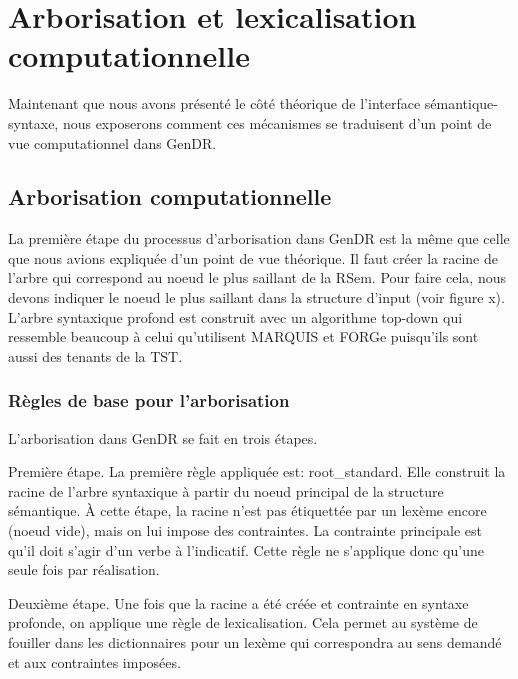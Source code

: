 
\section{Arborisation et lexicalisation computationnelle}\label{secarbolex}

Maintenant que nous avons présenté le côté théorique de l'interface sémantique-syntaxe, nous exposerons comment ces mécanismes se traduisent d'un point de vue computationnel dans GenDR.

\subsection{Arborisation computationnelle}
La première étape du processus d'arborisation dans GenDR est la même que celle que nous avions expliquée d'un point de vue théorique. Il faut créer la racine de l'arbre qui correspond au noeud le plus saillant de la RSem. Pour faire cela, nous devons indiquer le noeud le plus saillant dans la structure d'input (voir figure x). L'arbre syntaxique profond est construit avec un algorithme top-down qui ressemble beaucoup à celui qu'utilisent MARQUIS et FORGe puisqu'ils sont aussi des tenants de la TST. 

\subsubsection{Règles de base pour l'arborisation}
L'arborisation dans GenDR se fait en trois étapes.

Première étape. La première règle appliquée est: root\_standard. Elle construit la racine de l'arbre syntaxique à partir du noeud principal de la structure sémantique. À cette étape, la racine n'est pas étiquettée par un lexème encore (noeud vide), mais on lui impose des contraintes. La contrainte principale est qu'il doit s'agir d'un verbe à l'indicatif. Cette règle ne s'applique donc qu'une seule fois par réalisation.

Deuxième étape. Une fois que la racine a été créée et contrainte en syntaxe profonde, on applique une règle de lexicalisation. Cela permet au système de fouiller dans les dictionnaires pour un lexème qui correspondra au sens demandé et aux contraintes imposées.

